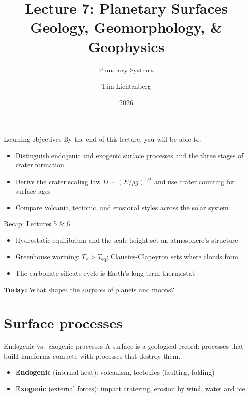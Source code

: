 \documentclass[aspectratio=169, 11pt]{beamer}
\title[Lecture 7: Surfaces]{Lecture 7: Planetary Surfaces\\Geology, Geomorphology, \& Geophysics}
\subtitle{Planetary Systems}
\author[L7]{Tim Lichtenberg}
\institute{Kapteyn Astronomical Institute\\University of Groningen}
\date{2026}
\begin{document}
\begin{frame}
  \titlepage
\end{frame}

\begin{frame}{Learning objectives}
  By the end of this lecture, you will be able to:
  \vskip8pt
  \begin{itemize}
    \item Distinguish endogenic and exogenic surface processes and the three stages of crater formation
    \item Derive the crater scaling law $D \sim (E/\rho g)^{1/4}$ and use crater counting for surface ages
    \item Compare volcanic, tectonic, and erosional styles across the solar system
  \end{itemize}
\end{frame}

\begin{frame}{Recap: Lectures 5 \& 6}
  \begin{itemize}
    \item Hydrostatic equilibrium and the scale height set an atmosphere's structure
    \item Greenhouse warming: $T_s > T_{\mathrm{eq}}$; Clausius-Clapeyron sets where clouds form
    \item The carbonate-silicate cycle is Earth's long-term thermostat
  \end{itemize}
  \vskip8pt
  \textbf{Today:} What shapes the \textit{surfaces} of planets and moons?
\end{frame}

\section{Surface processes}

\begin{frame}{Endogenic vs.\ exogenic processes}
  A surface is a geological record: processes that build landforms compete with processes that destroy them.
  \vskip8pt
  \begin{itemize}\setlength\itemsep{4pt}
    \item \textbf{Endogenic} (internal heat): volcanism, tectonics (faulting, folding)
    \item \textbf{Exogenic} (external forces): impact cratering, erosion by wind, water and ice
  \end{itemize}
  \vskip8pt
\end{frame}
\end{document}

